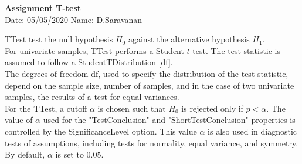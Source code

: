 \documentclass[a4paper,10pt,openright]{report}
\begin{document}
\singlespacing
\pagestyle{plain}

\begin{center}
\textbf{Assignment T-test} \\
Date: 05/05/2020 \hspace{2mm} Name: D.Saravanan
\end{center}

\vspace{10px}

TTest test the null hypothesis $H_{0}$ against the alternative hypothesis $H_{1}$. \\

For univariate samples, TTest performs a Student $t$ test. The test statistic is assumed to
follow a StudentTDistribution [df]. \\ 

The degrees of freedom df, used to specify the distribution of the test statistic, depend on
the sample size, number of samples, and in the case of two univariate samples, the results 
of a test for equal variances. \\ 

For the TTest, a cutoff $\alpha$ is chosen such that $H_{0}$ is rejected only if $p < \alpha
$. The value of $\alpha$ used for the "TestConclusion" and "ShortTestConclusion" properties 
is controlled by the SignificanceLevel option. This value $\alpha$ is also used in diagnostic
tests of assumptions, including tests for normality, equal variance, and symmetry. By 
default, $\alpha$ is set to $0.05$. 
\end{document}
